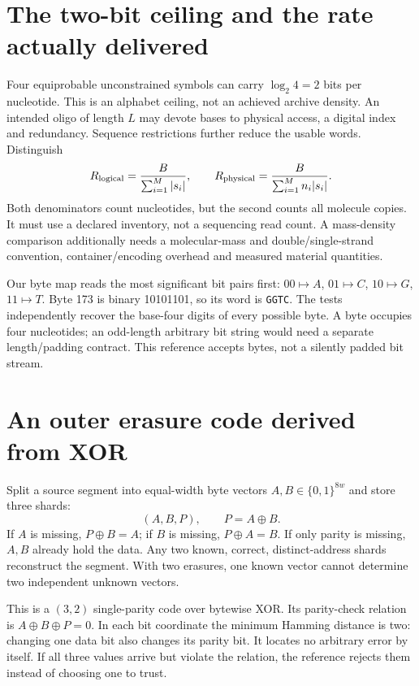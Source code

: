 \section{The two-bit ceiling and the rate actually delivered}
Four equiprobable unconstrained symbols can carry $\log_2 4=2$ bits per nucleotide.
This is an alphabet ceiling, not an achieved archive density. An intended oligo of
length $L$ may devote bases to physical access, a digital index and redundancy.
Sequence restrictions further reduce the usable words. Distinguish
\begin{equation}
R_{\rm logical}=\frac{B}{\sum_{i=1}^{M}|s_i|},
\qquad
R_{\rm physical}=\frac{B}{\sum_{i=1}^{M} n_i|s_i|}.
\label{dnad25:rate}
\end{equation}
Both denominators count nucleotides, but the second counts all molecule copies.
It must use a declared inventory, not a sequencing read count. A mass-density
comparison additionally needs a molecular-mass and double/single-strand
convention, container/encoding overhead and measured material quantities.

Our byte map reads the most significant bit pairs first:
$00\mapsto A$, $01\mapsto C$, $10\mapsto G$, $11\mapsto T$.
Byte 173 is binary 10101101, so its word is \texttt{GGTC}.
The tests independently recover the base-four digits of every possible byte.
A byte occupies four nucleotides; an odd-length arbitrary bit string would need
a separate length/padding contract. This reference accepts bytes, not a silently
padded bit stream.

\section{An outer erasure code derived from XOR}
Split a source segment into equal-width byte vectors $A,B\in\{0,1\}^{8w}$ and
store three shards:
\begin{equation}
(A,B,P),\qquad P=A\oplus B.
\label{dnad25:parity}
\end{equation}
If $A$ is missing, $P\oplus B=A$; if $B$ is missing, $P\oplus A=B$.
If only parity is missing, $A,B$ already hold the data. Any two known,
correct, distinct-address shards reconstruct the segment. With two erasures,
one known vector cannot determine two independent unknown vectors.

This is a $(3,2)$ single-parity code over bytewise XOR. Its parity-check relation
is $A\oplus B\oplus P=0$. In each bit coordinate the minimum Hamming distance
is two: changing one data bit also changes its parity bit. It locates no arbitrary
error by itself. If all three values arrive but violate the relation, the reference
rejects them instead of choosing one to trust.

